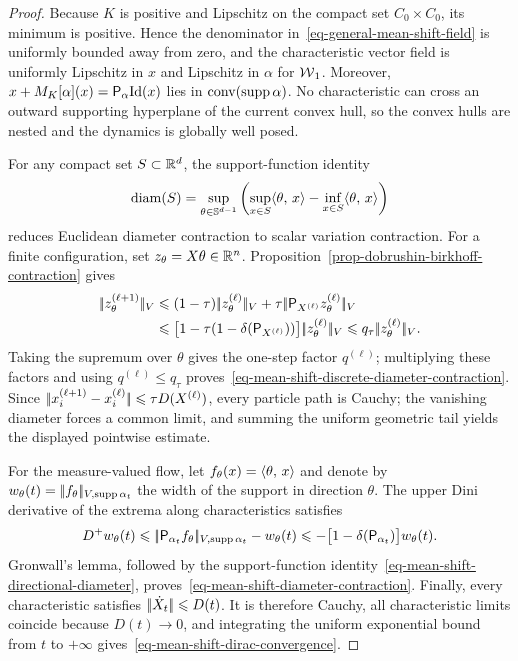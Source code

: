 \begin{proof}
	Because $K$ is positive and Lipschitz on the compact set $C_0\times C_0$, its minimum is positive. Hence the denominator in~\eqref{eq-general-mean-shift-field} is uniformly bounded away from zero, and the characteristic vector field is uniformly Lipschitz in $x$ and Lipschitz in $\alpha$ for $\operatorname{\mathcal{W}}_1$. Moreover, $x+M_K[\alpha](x)=\mathsf P_\alpha\mathrm{Id}(x)$ lies in $\operatorname{conv}(\operatorname{supp}\alpha)$. No characteristic can cross an outward supporting hyperplane of the current convex hull, so the convex hulls are nested and the dynamics is globally well posed.

	For any compact set $S\subset\mathbb{R}^d$, the support-function identity
	\begin{equation}\label{eq-mean-shift-directional-diameter}
		\operatorname{diam}(S)
		=
		\sup_{\theta\in\mathbb{S}^{d-1}}
		\left(\sup_{x\in S}\langle \theta,\,x\rangle-\inf_{x\in S}\langle \theta,\,x\rangle\right)
	\end{equation}
	reduces Euclidean diameter contraction to scalar variation contraction. For a finite configuration, set $z_\theta=X\theta\in\mathbb{R}^n$. Proposition~\ref{prop-dobrushin-birkhoff-contraction} gives
	\begin{align*}
		\norm{z_\theta^{(\ell+1)}}_V
		&\leq
		(1-\tau)\norm{z_\theta^{(\ell)}}_V
		+\tau\norm{\mathsf P_{X^{(\ell)}}z_\theta^{(\ell)}}_V\\
		&\leq
		\bigl[1-\tau(1-\delta(\mathsf P_{X^{(\ell)}}))\bigr]\norm{z_\theta^{(\ell)}}_V
		\leq
		q_\tau\norm{z_\theta^{(\ell)}}_V.
	\end{align*}
	Taking the supremum over $\theta$ gives the one-step factor $q^{(\ell)}$; multiplying these factors and using $q^{(\ell)}\leq q_\tau$ proves~\eqref{eq-mean-shift-discrete-diameter-contraction}. Since $|\!| x_i^{(\ell+1)}-x_i^{(\ell)} |\!|\leqslant\tau D(X^{(\ell)})$, every particle path is Cauchy; the vanishing diameter forces a common limit, and summing the uniform geometric tail yields the displayed pointwise estimate.

	For the measure-valued flow, let $f_\theta(x)=\langle \theta,\,x\rangle$ and denote by $w_\theta(t)=|\!| f_\theta |\!|_{V,\operatorname{supp}\alpha_t}$ the width of the support in direction $\theta$. The upper Dini derivative of the extrema along characteristics satisfies
	\[
		D^+w_\theta(t)
		\leqslant
		|\!| \mathsf P_{\alpha_t}f_\theta |\!|_{V,\operatorname{supp}\alpha_t}
		-w_\theta(t)
		\leqslant
		-\bigl[1-\delta(\mathsf P_{\alpha_t})\bigr]w_\theta(t).
	\]
	Gronwall's lemma, followed by the support-function identity~\eqref{eq-mean-shift-directional-diameter}, proves~\eqref{eq-mean-shift-diameter-contraction}. Finally, every characteristic satisfies $|\!| \dot X_t |\!|\leqslant D(t)$. It is therefore Cauchy, all characteristic limits coincide because $D(t)\to0$, and integrating the uniform exponential bound from $t$ to $+\infty$ gives~\eqref{eq-mean-shift-dirac-convergence}.
\end{proof}

